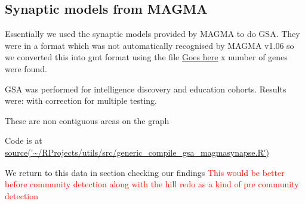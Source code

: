 \subsection{Synaptic models from MAGMA}

Essentially we used the synaptic models provided by MAGMA to do GSA. They were in a format which was not automatically recognised by MAGMA v1.06 so we converted this into gmt format using the file \url{Goes here}
x number of genes were found. 

GSA was performed for intelligence discovery and education cohorts. 
Results were: with correction for multiple testing.

These are non contiguous areas on the graph

Code is at \url{source('~/RProjects/utils/src/generic_compile_gsa_magmasynapse.R')}

We return to this data in section checking our findings 
\textcolor{red}{This would be better before community detection along with the hill redo as a kind of pre community detection}


